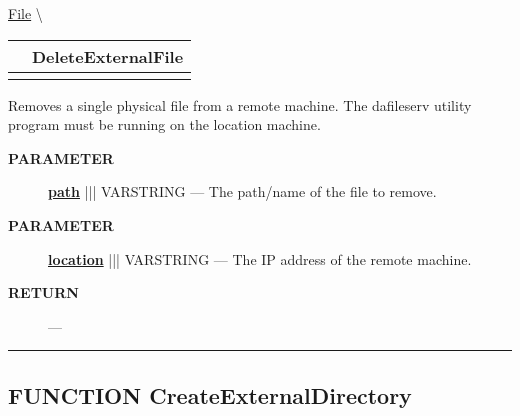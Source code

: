 \hypertarget{ecldoc:file.deleteexternalfile}{}
\hspace{0pt} \hyperlink{ecldoc:File}{File} \textbackslash 

{\renewcommand{\arraystretch}{1.5}
\begin{tabularx}{\textwidth}{|>{\raggedright\arraybackslash}l|X|}
\hline
\hspace{0pt}\mytexttt{\color{red} } & \textbf{DeleteExternalFile} \\
\hline
\multicolumn{2}{|>{\raggedright\arraybackslash}X|}{\hspace{0pt}\mytexttt{\color{param} (varstring location, varstring path)}} \\
\hline
\end{tabularx}
}

\par





Removes a single physical file from a remote machine. The dafileserv utility program must be running on the location machine.






\par
\begin{description}
\item [\colorbox{tagtype}{\color{white} \textbf{\textsf{PARAMETER}}}] \textbf{\underline{path}} ||| VARSTRING --- The path/name of the file to remove.
\item [\colorbox{tagtype}{\color{white} \textbf{\textsf{PARAMETER}}}] \textbf{\underline{location}} ||| VARSTRING --- The IP address of the remote machine.
\end{description}







\par
\begin{description}
\item [\colorbox{tagtype}{\color{white} \textbf{\textsf{RETURN}}}] \textbf{} --- 
\end{description}




\rule{\linewidth}{0.5pt}
\subsection*{\textsf{\colorbox{headtoc}{\color{white} FUNCTION}
CreateExternalDirectory}}

